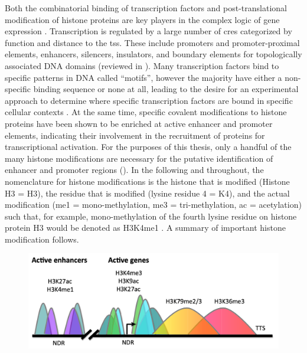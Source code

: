 Both the combinatorial binding of transcription factors and post-translational modification of histone proteins are key players in the complex logic of gene expression \cite{Farnham2009}. Transcription is regulated by a large number of \glspl{cre} categorized by function and distance to the \gls{tss}. These include promoters and promoter-proximal elements, enhancers, silencers, insulators, and boundary elements for topologically associated DNA domains (reviewed in \textcite{Wittkopp2011}). Many transcription factors bind to specific patterns in DNA called ``motifs'', however the majority have either a non-specific binding sequence or none at all, leading to the desire for an experimental approach to determine where specific transcription factors are bound in specific cellular contexts \cite{Spitz2012}. At the same time, specific covalent modifications to histone proteins have been shown to be enriched at active enhancer and promoter elements, indicating their involvement in the recruitment of proteins for transcriptional activation. For the purposes of this thesis, only a handful of the many histone modifications are necessary for the putative identification of enhancer and promoter regions (). In the following and throughout, the nomenclature for histone modifications is the histone that is modified (Histone H3 = H3), the residue that is modified (lysine residue 4 = K4), and the actual modification (me1 = mono-methylation, me3 = tri-methylation, ac = acetylation) such that, for example, mono-methylation of the fourth lysine residue on histone protein H3 would be denoted as H3K4me1 \cite{Gates2017}. A summary of important histone modification follows.

\begin{figure}
    \centering
    \includegraphics[width=\textwidth]{plot/ch1/histones}
    \label{fig:histones}
\end{figure}

